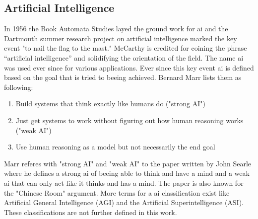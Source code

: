 \documentclass[10pt,a4paper]{article}
\begin{document}
\subsection{Artificial Intelligence}
In 1956 the Book Automata Studies\cite{McCarthy1956} layed the ground work for \gls{ai} and the Dartmouth summer research project on artificial intelligence marked the key event "to nail the flag to the mast." McCarthy is credited for coining the phrase “artificial intelligence” and solidifying the orientation of the field\cite{moor2006dartmouth}. The name \gls{ai} was used ever since for various applications. Ever since this key event \gls{ai} is defined based on the goal that is tried to beeing achieved. Bernard Marr lists them as following:\cite{Marr2018}
\begin{enumerate}
\item Build systems that think exactly like humans do ("strong AI") 
\item Just get systems to work without figuring out how human reasoning works ("weak AI")
\item Use human reasoning as a model but not necessarily the end goal
\end{enumerate}
Marr referes with "strong AI" and "weak AI" to the paper written by John Searle where he defines a strong \gls{ai} of beeing able to think and have a mind and a weak \gls{ai} that can only act like it thinks and has a mind. The paper is also known for the "Chinese Room" argument\cite{Searle1980}. More terms for a \gls{ai} classification exist like Artificial General Intelligence (AGI) and the Artificial Superintelligence (ASI). These classifications are not further defined in this work.
\end{document}
